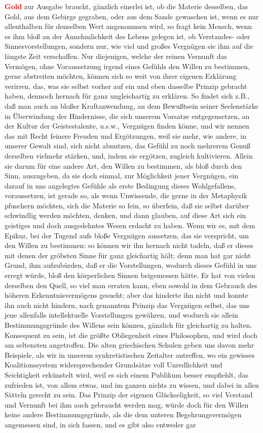 \documentclass[a4paper,12pt,twoside]{book}
\newcommand{\match}[1]{\textcolor{red}{\textbf{#1}}}
\begin{document}
\match{Gold} zur Ausgabe  braucht, gänzlich einerlei ist, ob die Materie desselben, das Gold, aus dem Gebirge gegraben, oder aus dem Sande gewaschen ist, wenn es nur allenthalben für denselben Wert angenommen wird, so fragt kein Mensch, wenn es ihm bloß an der Annehmlichkeit des Lebens gelegen ist, ob Verstandes- oder Sinnesvorstellungen, sondern nur, wie viel und großes Vergnügen sie ihm auf die längste Zeit verschaffen. Nur diejenigen, welche der reinen Vernunft das Vermögen, ohne Voraussetzung irgend eines Gefühls den Willen zu bestimmen, gerne abstreiten möchten, können sich so weit von ihrer eigenen Erklärung verirren, das, was sie selbst vorher auf ein und eben dasselbe Prinzip gebracht haben, dennoch hernach für ganz ungleichartig zu erklären. So findet sich z.B., daß man auch an bloßer Kraftanwendung, an dem Bewußtsein seiner Seelenstärke in Überwindung der Hindernisse, die sich unserem Vorsatze entgegensetzen, an der Kultur der Geistestalente, u.s.w., Vergnügen finden könne, und wir nennen das mit Recht feinere Freuden und Ergötzungen, weil sie mehr, wie andere, in unserer Gewalt sind, sich nicht abnutzen, das Gefühl zu noch mehrerem Genuß derselben vielmehr stärken, und, indem sie ergötzen, zugleich kultivieren. Allein sie darum für eine andere Art, den Willen zu bestimmen, als bloß durch den Sinn, auszugeben, da sie doch einmal, zur Möglichkeit jener Vergnügen, ein darauf in uns angelegtes Gefühle als erste Bedingung dieses Wohlgefallens, voraussetzen, ist gerade so, als wenn Unwissende, die gerne in der Metaphysik pfuschern möchten, sich die Materie so fein, so überfein, daß sie selbst darüber schwindlig werden möchten, denken, und dann glauben, auf diese Art sich ein geistiges und doch ausgedehntes Wesen erdacht zu haben. Wenn wir es, mit dem Epikur, bei der Tugend aufs bloße Vergnügen aussetzen, das sie verspricht, um den Willen zu bestimmen: so können wir ihn hernach nicht tadeln, daß er dieses mit denen der gröbsten Sinne für ganz gleichartig hält; denn man hat gar nicht Grund, ihm aufzubürden, daß er die Vorstellungen, wodurch dieses Gefühl in uns erregt würde, bloß den körperlichen Sinnen beigemessen hätte. Er hat von vielen derselben  den Quell, so viel man erraten kann, eben sowohl in dem Gebrauch des höheren Erkenntnisvermögens gesucht; aber das hinderte ihn nicht und konnte ihn auch nicht hindern, nach genanntem Prinzip das Vergnügen selbst, das uns jene allenfalls intellektuelle Vorstellungen gewähren, und wodurch sie allein Bestimmungsgründe des Willens sein können, gänzlich für gleichartig zu halten. Konsequent zu sein, ist die größte Obliegenheit eines Philosophen, und wird doch am seltensten angetroffen. Die alten griechischen Schulen geben uns davon mehr Beispiele, als wir in unserem synkretistischen Zeitalter antreffen, wo ein gewisses Koalitionssystem widersprechender Grundsätze voll Unredlichkeit und Seichtigkeit erkünstelt wird, weil es sich einem Publikum besser empfiehlt, das zufrieden ist, von allem etwas, und im ganzen nichts zu wissen, und dabei in allen Sätteln gerecht zu sein. Das Prinzip der eigenen Glückseligkeit, so viel Verstand und Vernunft bei ihm auch gebraucht werden mag, würde doch für den Willen keine andere Bestimmungsgründe, als die dem unteren Begehrungsvermögen angemessen sind, in sich fassen, und es gibt also entweder gar 
\end{document}
